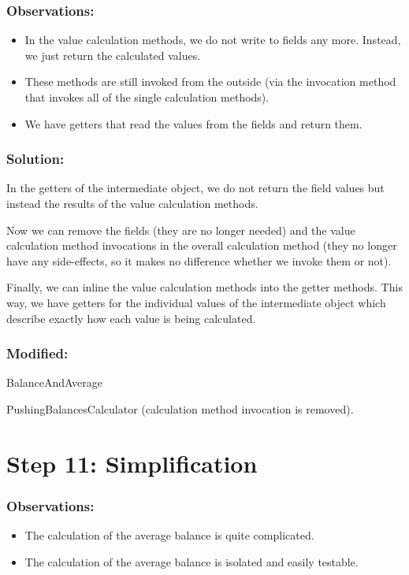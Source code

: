 \documentclass[a4paper,fleqn,titlepage,11pt]{article}
\begin{document}
\subsubsection*{Observations:}
\begin{itemize}
\item In the value calculation methods, we do not write to fields any more. Instead, we just return the calculated values.
\item These methods are still invoked from the outside (via the invocation method that invokes all of the single calculation methods).
\item We have getters that read the values from the fields and return them.
\end{itemize}

\subsubsection*{Solution:}

In the getters of the intermediate object, we do not return the field values but instead the results of the value calculation methods.

Now we can remove the fields (they are no longer needed) and the value calculation method invocations in the overall calculation method (they no longer have any side-effects, so it makes no difference whether we invoke them or not).

Finally, we can inline the value calculation methods into the getter methods. This way, we have getters for the individual values of the intermediate object which describe exactly how each value is being calculated.

\subsubsection*{Modified:}

BalanceAndAverage

PushingBalancesCalculator (calculation method invocation is removed).

\section*{Step 11: Simplification}

\subsubsection*{Observations:}
\begin{itemize}
\item The calculation of the average balance is quite complicated.
\item The calculation of the average balance is isolated and easily testable.
\end{itemize}
\end{document}
